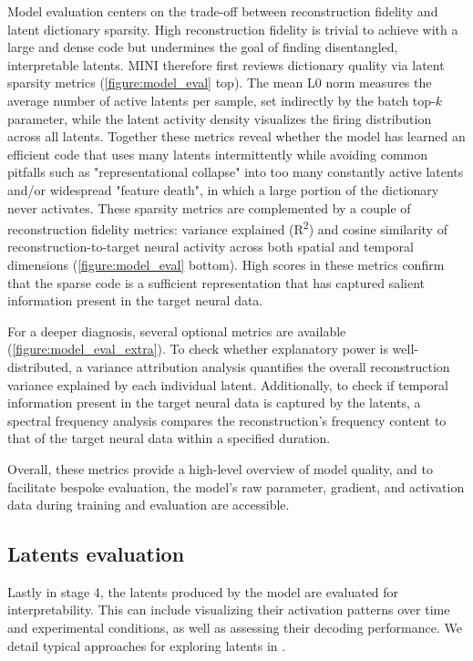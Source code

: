 Model evaluation centers on the trade-off between reconstruction fidelity and latent dictionary sparsity. High reconstruction fidelity is trivial to achieve with a large and dense code but undermines the goal of finding disentangled, interpretable latents. MINI therefore first reviews dictionary quality via latent sparsity metrics (\autoref{figure:model_eval} top). The mean L0 norm measures the average number of active latents per sample, set indirectly by the batch top-$k$ parameter, while the latent activity density visualizes the firing distribution across all latents. Together these metrics reveal whether the model has learned an efficient code that uses many latents intermittently while avoiding common pitfalls such as "representational collapse" into too many constantly active latents and/or widespread "feature death", in which a large portion of the dictionary never activates. These sparsity metrics are complemented by a couple of reconstruction fidelity metrics: variance explained (R\textsuperscript{2}) and cosine similarity of reconstruction-to-target neural activity across both spatial and temporal dimensions (\autoref{figure:model_eval} bottom). High scores in these metrics confirm that the sparse code is a sufficient representation that has captured salient information present in the target neural data.

For a deeper diagnosis, several optional metrics are available (\autoref{figure:model_eval_extra}). To check whether explanatory power is well-distributed, a variance attribution analysis quantifies the overall reconstruction variance explained by each individual latent. Additionally, to check if temporal information present in the target neural data is captured by the latents, a spectral frequency analysis compares the reconstruction's frequency content to that of the target neural data within a specified duration. 

Overall, these metrics provide a high-level overview of model quality, and to facilitate bespoke evaluation, the model's raw parameter, gradient, and activation data during training and evaluation are accessible.

\subsection{Latents evaluation}

Lastly in stage 4, the latents produced by the model are evaluated for interpretability. This can include visualizing their activation patterns over time and experimental conditions, as well as assessing their decoding performance. We detail typical approaches for exploring latents in .
